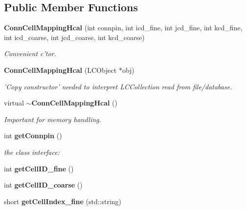 \subsection*{Public Member Functions}
\begin{DoxyCompactItemize}
\item 
{\bf Conn\-Cell\-Mapping\-Hcal} (int connpin, int icd\-\_\-fine, int jcd\-\_\-fine, int kcd\-\_\-fine, int icd\-\_\-coarse, int jcd\-\_\-coarse, int kcd\-\_\-coarse)\label{classCALICE_1_1ConnCellMappingHcal_ab42f668b5748b8dfa9b3fc97fa6c7fee}

\begin{DoxyCompactList}\small\item\em Convenient c'tor. \end{DoxyCompactList}\item 
{\bf Conn\-Cell\-Mapping\-Hcal} (L\-C\-Object $\ast$obj)\label{classCALICE_1_1ConnCellMappingHcal_a081e0f8e841d6f434e17b670cab48d7e}

\begin{DoxyCompactList}\small\item\em 'Copy constructor' needed to interpret L\-C\-Collection read from file/database. \end{DoxyCompactList}\item 
virtual {\bf $\sim$\-Conn\-Cell\-Mapping\-Hcal} ()\label{classCALICE_1_1ConnCellMappingHcal_a7a197aeb49859189e104e3d5d94d0391}

\begin{DoxyCompactList}\small\item\em Important for memory handling. \end{DoxyCompactList}\item 
int {\bf get\-Connpin} ()\label{classCALICE_1_1ConnCellMappingHcal_a98cddfbd965baa2a65f830c4b19c9dfc}

\begin{DoxyCompactList}\small\item\em the class interface\-: \end{DoxyCompactList}\item 
int {\bfseries get\-Cell\-I\-D\-\_\-fine} ()\label{classCALICE_1_1ConnCellMappingHcal_a86446b579f23ddac044afa98f83be109}

\item 
int {\bfseries get\-Cell\-I\-D\-\_\-coarse} ()\label{classCALICE_1_1ConnCellMappingHcal_a8136c2a1622f865fcdab81cda25284e5}

\item 
short {\bf get\-Cell\-Index\-\_\-fine} (std\-::string)\label{classCALICE_1_1ConnCellMappingHcal_acede8240bf218adff8d40e23d7c7903a}


\end{DoxyCompactItemize}

